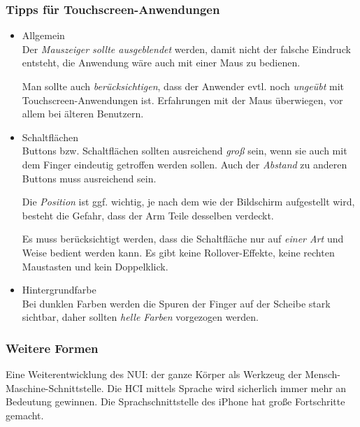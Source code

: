 \subsubsection{Tipps für Touchscreen-Anwendungen}
\begin{itemize}
\item Allgemein\\
Der \emph{Mauszeiger sollte ausgeblendet} werden, damit nicht der falsche Eindruck entsteht, die Anwendung wäre auch mit einer Maus zu bedienen.

Man sollte auch \emph{berücksichtigen}, dass der Anwender evtl. noch \emph{ungeübt} mit Touchscreen-Anwendungen ist. Erfahrungen mit der Maus überwiegen, vor allem bei älteren Benutzern.
\item Schaltflächen\\
Buttons bzw. Schaltflächen sollten ausreichend \emph{groß} sein, wenn sie auch mit dem Finger eindeutig getroffen werden sollen.  Auch der \emph{Abstand} zu anderen Buttons muss ausreichend sein.

Die \emph{Position} ist ggf. wichtig, je nach dem wie der Bildschirm aufgestellt wird, besteht die Gefahr, dass der Arm Teile desselben verdeckt. 

Es muss berücksichtigt werden, dass die Schaltfläche nur auf \emph{einer Art} und Weise bedient werden kann. Es gibt keine Rollover-Effekte, keine rechten Maustasten und kein Doppelklick.
\item Hintergrundfarbe\\
Bei dunklen Farben werden die Spuren der Finger auf der Scheibe stark sichtbar, daher sollten \emph{helle Farben} vorgezogen werden.
\end{itemize}
\subsubsection{Weitere Formen}
Eine Weiterentwicklung des NUI: der ganze Körper als Werkzeug der Mensch-Maschine-Schnittstelle.
Die HCI mittels Sprache wird sicherlich immer mehr an Bedeutung gewinnen. Die Sprachschnittstelle des iPhone hat große Fortschritte gemacht. 






